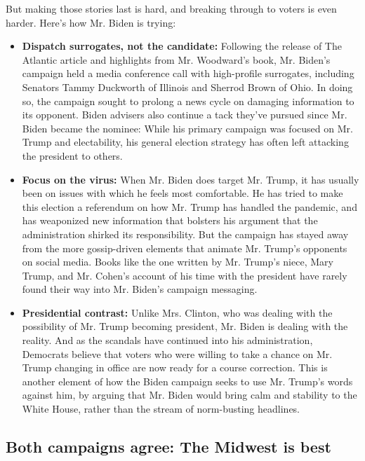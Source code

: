 But making those stories last is hard, and breaking through to voters is
even harder. Here's how Mr. Biden is trying:

\begin{itemize}
\item
  \textbf{Dispatch surrogates, not the candidate:} Following the release
  of The Atlantic article and highlights from Mr. Woodward's book, Mr.
  Biden's campaign held a media conference call with high-profile
  surrogates, including Senators Tammy Duckworth of Illinois and Sherrod
  Brown of Ohio. In doing so, the campaign sought to prolong a news
  cycle on damaging information to its opponent. Biden advisers also
  continue a tack they've pursued since Mr. Biden became the nominee:
  While his primary campaign was focused on Mr. Trump and electability,
  his general election strategy has often left attacking the president
  to others.
\item
  \textbf{Focus on the virus:} When Mr. Biden does target Mr. Trump, it
  has usually been on issues with which he feels most comfortable. He
  has tried to make this election a referendum on how Mr. Trump has
  handled the pandemic, and has weaponized new information that bolsters
  his argument that the administration shirked its responsibility. But
  the campaign has stayed away from the more gossip-driven elements that
  animate Mr. Trump's opponents on social media. Books like the one
  written by Mr. Trump's niece, Mary Trump, and Mr. Cohen's account of
  his time with the president have rarely found their way into Mr.
  Biden's campaign messaging.
\item
  \textbf{Presidential contrast:} Unlike Mrs. Clinton, who was dealing
  with the possibility of Mr. Trump becoming president, Mr. Biden is
  dealing with the reality. And as the scandals have continued into his
  administration, Democrats believe that voters who were willing to take
  a chance on Mr. Trump changing in office are now ready for a course
  correction. This is another element of how the Biden campaign seeks to
  use Mr. Trump's words against him, by arguing that Mr. Biden would
  bring calm and stability to the White House, rather than the stream of
  norm-busting headlines.
\end{itemize}

\hypertarget{both-campaigns-agree-the-midwest-is-best}{%
\subsection{Both campaigns agree: The Midwest is
best}\label{both-campaigns-agree-the-midwest-is-best}}

